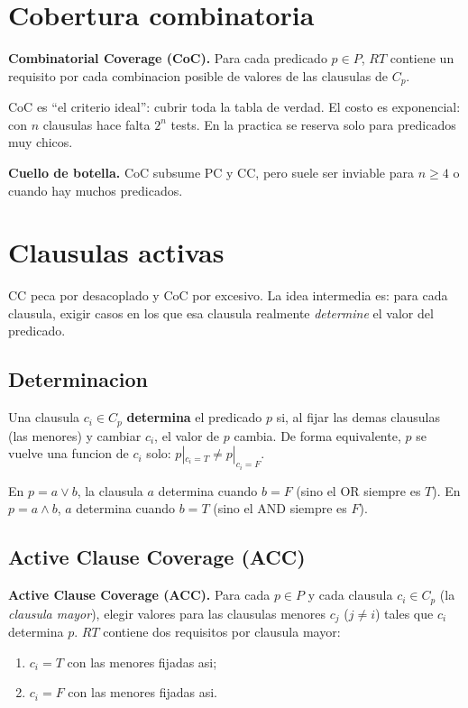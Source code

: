 \documentclass[12pt,a4paper]{article}
\begin{document}
\section{Cobertura combinatoria}

\begin{definicionbox}
\textbf{Combinatorial Coverage (CoC).} Para cada predicado $p \in P$, $RT$ contiene un requisito
por cada combinacion posible de valores de las clausulas de $C_p$.
\end{definicionbox}

CoC es ``el criterio ideal'': cubrir toda la tabla de verdad. El costo es exponencial: con $n$
clausulas hace falta $2^n$ tests. En la practica se reserva solo para predicados muy chicos.

\textbf{Cuello de botella.} CoC subsume PC y CC, pero suele ser inviable para
$n \ge 4$ o cuando hay muchos predicados.

\section{Clausulas activas}

CC peca por desacoplado y CoC por excesivo. La idea intermedia es: para cada clausula, exigir
casos en los que esa clausula realmente \emph{determine} el valor del predicado.

\subsection{Determinacion}

\begin{definicionbox}
Una clausula $c_i \in C_p$ \textbf{determina} el predicado $p$ si, al fijar las demas clausulas
(las menores) y cambiar $c_i$, el valor de $p$ cambia. De forma equivalente, $p$ se vuelve una
funcion de $c_i$ solo: $p|_{c_i=T} \neq p|_{c_i=F}$.
\end{definicionbox}

\begin{ejemplobox}
En $p = a \vee b$, la clausula $a$ determina cuando $b=F$ (sino el OR siempre es $T$). En
$p = a \wedge b$, $a$ determina cuando $b=T$ (sino el AND siempre es $F$).
\end{ejemplobox}

\subsection{Active Clause Coverage (ACC)}

\begin{definicionbox}
\textbf{Active Clause Coverage (ACC).} Para cada $p \in P$ y cada clausula $c_i \in C_p$ (la
\emph{clausula mayor}), elegir valores para las clausulas menores $c_j$ ($j \ne i$) tales que
$c_i$ determina $p$. $RT$ contiene dos requisitos por clausula mayor:
\begin{enumerate}
  \item $c_i = T$ con las menores fijadas asi;
  \item $c_i = F$ con las menores fijadas asi.
\end{enumerate}
\end{definicionbox}
\end{document}
